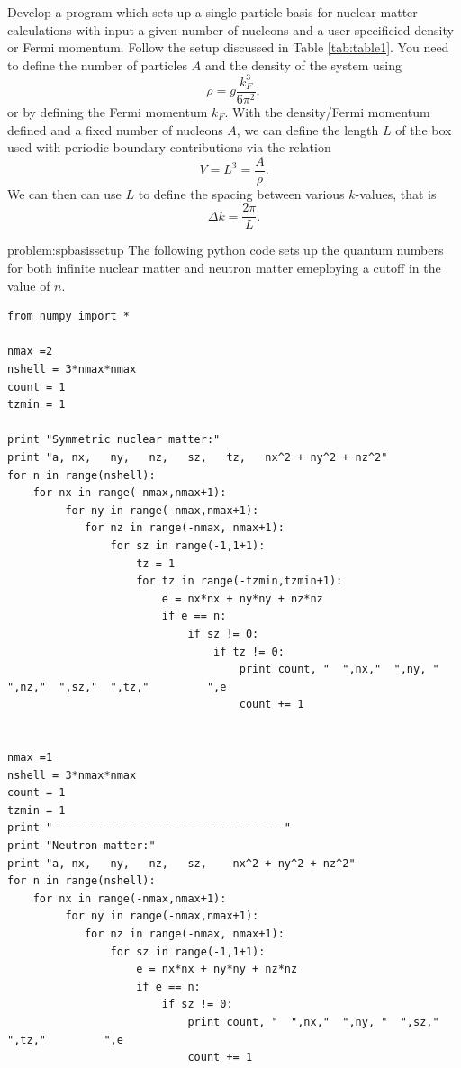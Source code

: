 \begin{prob}\label{problem:spbasissetup}
Develop a program which sets up a single-particle basis
for nuclear matter calculations with input a given number of nucleons and a user specificied 
density or Fermi momentum. Follow the setup discussed in Table \ref{tab:table1}. 
You need to define the number of particles $A$
and the density of the system using 
\[
\rho = g \frac{k_F^3}{6\pi^2},
\]
or by defining the Fermi momentum $k_F$.
With the density/Fermi momentum  defined and a fixed number of nucleons $A$,
we can define the length $L$ of the box used with periodic
boundary contributions via the relation
\[
  V= L^3= \frac{A}{\rho}.
\]
We can then  can use $L$ to define the spacing between
various $k$-values, that is
\[
  \Delta k = \frac{2\pi}{L}.
\]
\end{prob}
\begin{sol}{problem:spbasissetup}
The following python code sets up the quantum numbers for both infinite nuclear matter and neutron 
matter emeploying a cutoff in the value of $n$.
\begin{lstlisting}
from numpy import *

nmax =2
nshell = 3*nmax*nmax
count = 1
tzmin = 1

print "Symmetric nuclear matter:"  
print "a, nx,   ny,   nz,   sz,   tz,   nx^2 + ny^2 + nz^2"
for n in range(nshell): 
    for nx in range(-nmax,nmax+1):
         for ny in range(-nmax,nmax+1):
            for nz in range(-nmax, nmax+1):  
                for sz in range(-1,1+1):
                    tz = 1
                    for tz in range(-tzmin,tzmin+1):
                        e = nx*nx + ny*ny + nz*nz
                        if e == n:
                            if sz != 0: 
                                if tz != 0: 
                                    print count, "  ",nx,"  ",ny, "  ",nz,"  ",sz,"  ",tz,"         ",e
                                    count += 1
                                    
                                    
nmax =1
nshell = 3*nmax*nmax
count = 1
tzmin = 1
print "------------------------------------"
print "Neutron matter:"                                    
print "a, nx,   ny,   nz,   sz,    nx^2 + ny^2 + nz^2"
for n in range(nshell): 
    for nx in range(-nmax,nmax+1):
         for ny in range(-nmax,nmax+1):
            for nz in range(-nmax, nmax+1):  
                for sz in range(-1,1+1):
                    e = nx*nx + ny*ny + nz*nz
                    if e == n:
                        if sz != 0: 
                            print count, "  ",nx,"  ",ny, "  ",sz,"  ",tz,"         ",e
                            count += 1                  
\end{lstlisting}                               
\end{sol}


